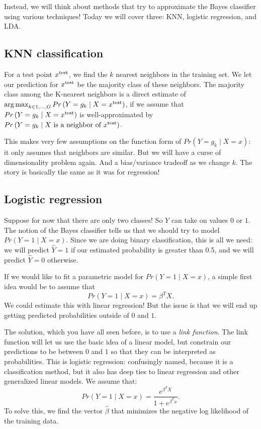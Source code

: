 Instead, we will think about methods that try to approximate the Bayes classifier using various techniques! Today we will cover three: KNN, logistic regression, and LDA. 

\subsection{KNN classification}

For a test point $x^{\mathrm{test}}$, we find the $k$ nearest neighbors in the training set. We let our prediction for $x^{\mathrm{test}}$ be the majority class of these neighbors. The majority class among the K-nearest neighbors is a direct estimate of $\mathop{\mathrm{arg\,max}}_{k \in 1,\ldots, G } Pr\left( Y = g_k \mid X=x^{\mathrm{test}} \right)$, if we assume that $Pr\left( Y = g_k \mid X=x^{\mathrm{test}} \right)$ is well-approximated by \\ $Pr\left( Y = g_k \mid X \text{ is a neighbor of } x^{\mathrm{test}} \right)$. 

This makes very few assumptions on the function form of 
$Pr\left( Y = g_k \mid X=x \right)$: it only assumes that neighbors are similar. But we will have a curse of dimensionality problem again. And a bias/variance tradeoff as we change $k$. The story is basically the same as it was for regression!

\subsection{Logistic regression}

Suppose for now that there are only two classes! So $Y$ can take on values $0$ or $1$. The notion of the Bayes classifier tells us that we should try to model $Pr(Y=1 \mid X=x)$. Since we are doing binary classification, this is all we need: we will predict $\hat{Y}=1$ if our estimated probability is greater than 0.5, and we will predict $\hat{Y}=0$ otherwise. 


If we would like to fit a parametric model for $Pr(Y=1 \mid X=x)$, a simple first idea would be to assume that
$$
Pr(Y=1 \mid X=x) = \beta^T X.
$$
We could estimate this with linear regression! But the issue is that we will end up getting predicted probabilities outside of $0$ and $1$.

The solution, which you have all seen before, is to use a \emph{link function}. The link function will let us use the basic idea of a linear model, but constrain our predictions to be between $0$ and $1$ so that they can be interpreted as probabilities. This is logistic regression: confusingly named, because it is a classification method, but it also has deep ties to linear regression and other generalized linear models. We assume that:
$$
Pr(Y=1 \mid X=x) = \frac{e^{\beta^T X}}{1 + e^{\beta^T x}}.
$$
To solve this, we find the vector $\hat{\beta}$ that minimizes the negative log likelihood of the training data. 

